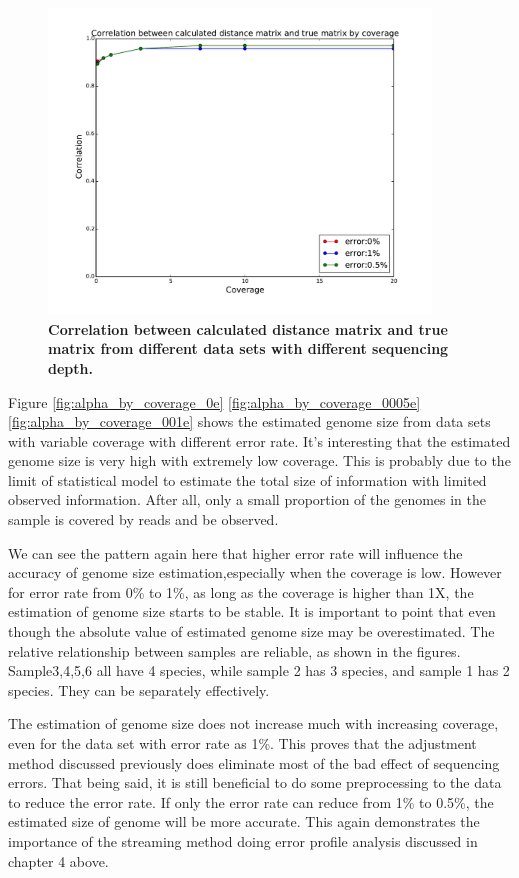 \begin{figure}[!ht]
 \centerline{\includegraphics[width=4in]{./figures/beta_by_coverage.pdf}}
\caption{\bf Correlation between calculated distance matrix and true matrix
from different data sets with different sequencing depth.}
\label{fig:IGS_correlation_coverage}
\end{figure}



Figure \ref{fig:alpha_by_coverage_0e} \ref{fig:alpha_by_coverage_0005e} \ref{fig:alpha_by_coverage_001e} 
shows the estimated genome size 
from data sets with variable coverage with different error rate.
It's interesting that the estimated genome size is very high with extremely low 
coverage. This is probably due to the limit of statistical model to estimate
the total size of information with limited observed information.
After all, only a small proportion of the genomes in the sample is covered by
reads and be observed. 

We can see the pattern again here that higher error rate will influence the accuracy
of genome size estimation,especially when the coverage is low. However for error rate
from 0\% to 1\%, as long as the coverage is higher than 1X, the estimation of 
genome size starts to be stable. 
It is important to point that even though the absolute value of estimated 
genome size may be overestimated. The relative relationship between samples 
are reliable, as shown in the figures. Sample3,4,5,6 all have 4 species, while 
sample 2 has 3 species, and sample 1 has 2 species. 
They can be separately effectively.

The estimation of genome size does not increase much with increasing coverage, 
even for the data set with error rate as 1\%. This proves that the adjustment method discussed
previously does eliminate most of the bad effect of sequencing errors. 
That being said, it is still beneficial to do some preprocessing to the data
to reduce the error rate. If only the error rate can reduce from 1\% to 0.5\%, the 
estimated size of genome will be more accurate. This again demonstrates the importance of
the streaming method doing error profile analysis discussed in chapter 4 above.

